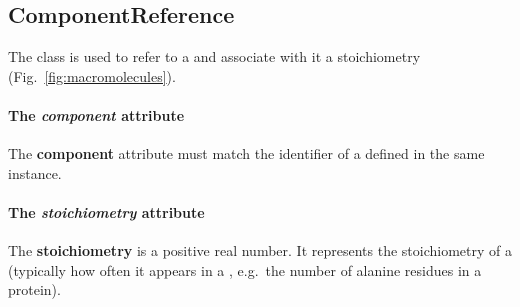 \subsection{ComponentReference}
\label{sec:component_reference}

The \componentreference{} class is used to refer to a \component{}
and associate with it a stoichiometry (Fig.~\ref{fig:macromolecules}).

\paragraph{The \textit{component} attribute}
The \textbf{component} attribute must match the identifier of a \component{}
defined in the same \rbamacromolecules{} instance.

\paragraph{The \textit{stoichiometry} attribute}
The \textbf{stoichiometry} is a positive real number.
It represents the stoichiometry of a \component{}
(typically how often it appears in a \macromolecule,
e.g.\ the number of alanine residues in a protein).
